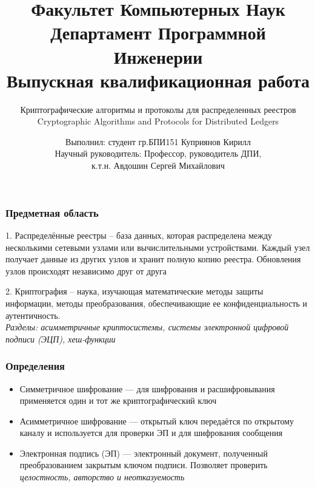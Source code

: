 \documentclass{beamer}
\title[Заголовок]{\footnotesize Факультет Компьютерных Наук\\Департамент
Программной Инженерии\\Выпускная квалификационная работа}
\subtitle{Криптографические алгоритмы и протоколы для распределенных реестров\\
Cryptographic Algorithms and Protocols for Distributed Ledgers}
\author[Куприянов К.И.]{\scriptsize Выполнил: студент
гр.БПИ151 Куприянов Кирилл\\Научный руководитель: Профессор, руководитель ДПИ,\\к.т.н. Авдошин Сергей Михайлович}
\institute[Высшая школа экономики]{}
\date{\the\year}
\begin{document}
\frame[plain]{
    \maketitle
}



\begin{frame}
\frametitle{Предметная область}
	\begin{multicols}{2}
        1. Распределённые реестры -- база данных, которая распределена между
        несколькими сетевыми узлами или вычислительными устройствами. Каждый
        узел получает данные из других узлов и хранит полную копию реестра.
        Обновления узлов происходят независимо друг от друга

		\columnbreak

        2. Криптография -- наука, изучающая математические методы защиты
        информации, методы преобразования, обеспечивающие ее конфиденциальность
        и аутентичность.\\
        \emph{Разделы: асимметричные криптосистемы, системы электронной цифровой
        подписи (ЭЦП), хеш-функции}
		\medskip
	\end{multicols}
\end{frame}

\begin{frame}
\frametitle{Определения}
        \begin{itemize}
            \item Симметричное шифрование --- для шифрования и расшифровывания
                  применяется один и тот же криптографический ключ
            \item Асимметричное шифрование --- открытый ключ передаётся по
                  открытому каналу и используется для проверки ЭП и для
                  шифрования сообщения
            \item Электронная подпись (ЭП) --- электронный документ, полученный
                  преобразованием закрытым ключом подписи. Позволяет проверить
                  \emph{целостность, авторство и неотказуемость}
        \end{itemize}
\end{frame}
\end{document}
